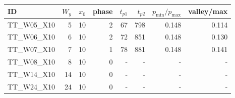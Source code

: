 \begin{tabular}{lrrrrrrr}
\toprule
ID & $W_y$ & $x_0$ & phase & $t_{p1}$ & $t_{p2}$ & $p_{\min}/p_{\max}$ & valley/max \\
\midrule
TT\_W05\_X10 & 5 & 10 & 2 & 67 & 798 & 0.148 & 0.114 \\
TT\_W06\_X10 & 6 & 10 & 2 & 72 & 851 & 0.148 & 0.130 \\
TT\_W07\_X10 & 7 & 10 & 1 & 78 & 881 & 0.148 & 0.141 \\
TT\_W08\_X10 & 8 & 10 & 0 & - & - & - & - \\
TT\_W14\_X10 & 14 & 10 & 0 & - & - & - & - \\
TT\_W24\_X10 & 24 & 10 & 0 & - & - & - & - \\
\bottomrule
\end{tabular}